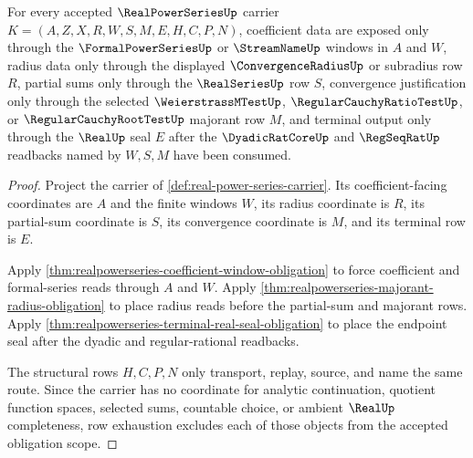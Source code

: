 \begin{theorem}
\label{thm:real-power-series-obligation-scope}
For every accepted $\RealPowerSeriesUp$ carrier $K=(A,Z,X,R,W,S,M,E,H,C,P,N)$, coefficient data are exposed only through the $\FormalPowerSeriesUp$ or $\StreamNameUp$ windows in $A$ and $W$, radius data only through the displayed $\ConvergenceRadiusUp$ or subradius row $R$, partial sums only through the $\RealSeriesUp$ row $S$, convergence justification only through the selected $\WeierstrassMTestUp$, $\RegularCauchyRatioTestUp$, or $\RegularCauchyRootTestUp$ majorant row $M$, and terminal output only through the $\RealUp$ seal $E$ after the $\DyadicRatCoreUp$ and $\RegSeqRatUp$ readbacks named by $W,S,M$ have been consumed.
\end{theorem}
\begin{proof}
Project the carrier of \autoref{def:real-power-series-carrier}. Its coefficient-facing coordinates are $A$ and the finite windows $W$, its radius coordinate is $R$, its partial-sum coordinate is $S$, its convergence coordinate is $M$, and its terminal row is $E$.

Apply \autoref{thm:realpowerseries-coefficient-window-obligation} to force coefficient and formal-series reads through $A$ and $W$. Apply \autoref{thm:realpowerseries-majorant-radius-obligation} to place radius reads before the partial-sum and majorant rows. Apply \autoref{thm:realpowerseries-terminal-real-seal-obligation} to place the endpoint seal after the dyadic and regular-rational readbacks.

The structural rows $H,C,P,N$ only transport, replay, source, and name the same route. Since the carrier has no coordinate for analytic continuation, quotient function spaces, selected sums, countable choice, or ambient $\RealUp$ completeness, row exhaustion excludes each of those objects from the accepted obligation scope.
\end{proof}

